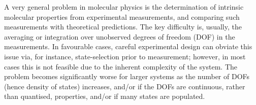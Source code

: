 A very general problem in molecular physics is the determination of intrinsic molecular properties from experimental measurements, and comparing such measurements with theoretical predictions. The key difficulty is, usually, the averaging or integration over unobserved degrees of freedom (DOF) in the measurements. In favourable cases, careful experimental design can obviate this issue via, for instance, state-selection prior to measurement; however, in most cases this is not feasible due to the inherent complexity of the system. The problem becomes significantly worse for larger systems as the number of DOFs (hence density of states) increases, and/or if the DOFs are continuous, rather than quantised, properties, and/or if many states are populated.